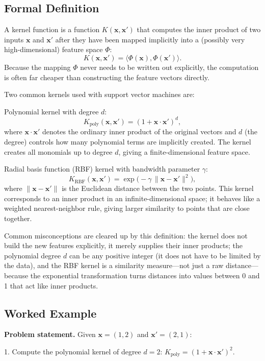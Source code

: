 \documentclass[12pt, a4paper]{article}
\begin{document}
\subsection{Formal Definition}
A kernel function is a function \(K(\mathbf{x},\mathbf{x}')\) that computes the inner product of two inputs \(\mathbf{x}\) and \(\mathbf{x}'\) after they have been mapped implicitly into a (possibly very high-dimensional) feature space \(\Phi\):
\[
K(\mathbf{x},\mathbf{x}') = \langle \Phi(\mathbf{x}), \Phi(\mathbf{x}') \rangle .
\]
Because the mapping \(\Phi\) never needs to be written out explicitly, the computation is often far cheaper than constructing the feature vectors directly.

Two common kernels used with support vector machines are:

 Polynomial kernel with degree \(d\):
  \[
  K_{\text{poly}}(\mathbf{x},\mathbf{x}') = (1 + \mathbf{x}\!\cdot\!\mathbf{x}')^{d},
  \]
  where \(\mathbf{x}\!\cdot\!\mathbf{x}'\) denotes the ordinary inner product of the original vectors and \(d\) (the degree) controls how many polynomial terms are implicitly created.  The kernel creates all monomials up to degree \(d\), giving a finite-dimensional feature space.

 Radial basis function (RBF) kernel with bandwidth parameter \(\gamma\):
  \[
  K_{\text{RBF}}(\mathbf{x},\mathbf{x}') = \exp\!\bigl(-\gamma \,\|\mathbf{x}-\mathbf{x}'\|^{2}\bigr),
  \]
  where \(\|\mathbf{x}-\mathbf{x}'\|\) is the Euclidean distance between the two points.  This kernel corresponds to an inner product in an infinite-dimensional space; it behaves like a weighted nearest-neighbor rule, giving larger similarity to points that are close together.

Common misconceptions are cleared up by this definition: the kernel does not build the new features explicitly, it merely supplies their inner products; the polynomial degree \(d\) can be any positive integer (it does not have to be limited by the data), and the RBF kernel is a similarity measure---not just a raw distance---because the exponential transformation turns distances into values between 0 and 1 that act like inner products.

\subsection{Worked Example}
\textbf{Problem statement.}  
Given \(\mathbf{x} = (1,2)\) and \(\mathbf{x}' = (2,1)\):

1. Compute the polynomial kernel of degree \(d = 2\):  
   \(K_{\text{poly}} = (1 + \mathbf{x}\!\cdot\!\mathbf{x}')^{2}\).
\end{document}
